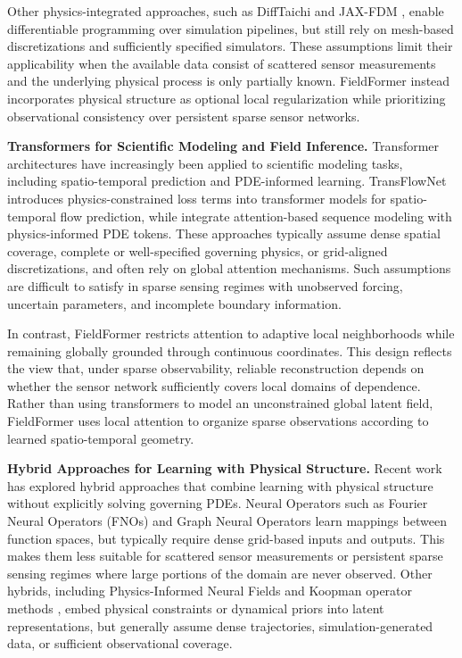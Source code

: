 Other physics-integrated approaches, such as DiffTaichi \citep{hu2019difftaichi} and JAX-FDM \citep{kochkov2021machine}, enable differentiable programming over simulation pipelines, but still rely on mesh-based discretizations and sufficiently specified simulators. These assumptions limit their applicability when the available data consist of scattered sensor measurements and the underlying physical process is only partially known. FieldFormer instead incorporates physical structure as optional local regularization while prioritizing observational consistency over persistent sparse sensor networks.

\noindent\textbf{Transformers for Scientific Modeling and Field Inference.}
Transformer architectures have increasingly been applied to scientific modeling tasks, including spatio-temporal prediction and PDE-informed learning. TransFlowNet \citep{wang2022transflownet} introduces physics-constrained loss terms into transformer models for spatio-temporal flow prediction, while \citet{lorsung2024physics} integrate attention-based sequence modeling with physics-informed PDE tokens. These approaches typically assume dense spatial coverage, complete or well-specified governing physics, or grid-aligned discretizations, and often rely on global attention mechanisms. Such assumptions are difficult to satisfy in sparse sensing regimes with unobserved forcing, uncertain parameters, and incomplete boundary information.

In contrast, FieldFormer restricts attention to adaptive local neighborhoods while remaining globally grounded through continuous coordinates. This design reflects the view that, under sparse observability, reliable reconstruction depends on whether the sensor network sufficiently covers local domains of dependence. Rather than using transformers to model an unconstrained global latent field, FieldFormer uses local attention to organize sparse observations according to learned spatio-temporal geometry.

\noindent\textbf{Hybrid Approaches for Learning with Physical Structure.}
Recent work has explored hybrid approaches that combine learning with physical structure without explicitly solving governing PDEs. Neural Operators such as Fourier Neural Operators (FNOs) \citep{li2020fourier} and Graph Neural Operators \citep{li2020neural} learn mappings between function spaces, but typically require dense grid-based inputs and outputs. This makes them less suitable for scattered sensor measurements or persistent sparse sensing regimes where large portions of the domain are never observed. Other hybrids, including Physics-Informed Neural Fields \citep{chu2022physics} and Koopman operator methods \citep{lusch2018deep}, embed physical constraints or dynamical priors into latent representations, but generally assume dense trajectories, simulation-generated data, or sufficient observational coverage.

